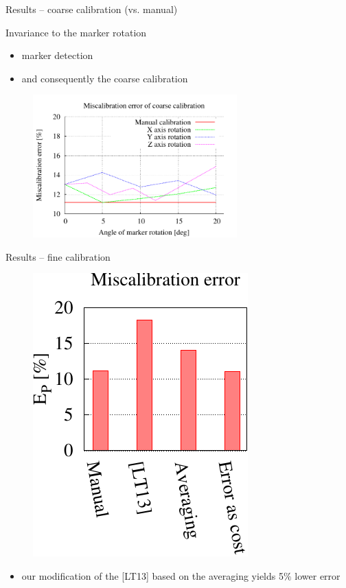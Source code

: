 \documentclass[pdf]{beamer}
\begin{document}
	\begin{frame}{Results -- coarse calibration (vs. manual)}
		\begin{block}{Invariance to the marker rotation}
			\begin{itemize}
				\item marker detection
				\item and consequently the coarse calibration
			\end{itemize}
		\end{block}

		\begin{figure}[h]
			\centering
			\includegraphics[width=0.7\textwidth]{fig/results.pdf}
		\end{figure}
	\end{frame}	
	
	\begin{frame}{Results -- fine calibration}
		\begin{figure}[h]
			\includegraphics[height=0.5\textwidth]{fig/evaluation-fine-error.pdf}
		\end{figure}
		
		\begin{itemize}
			\item our modification of the [LT13] based on the averaging yields 5$\%$ lower error
		\end{itemize}
	\end{frame}	
	
\end{document}
